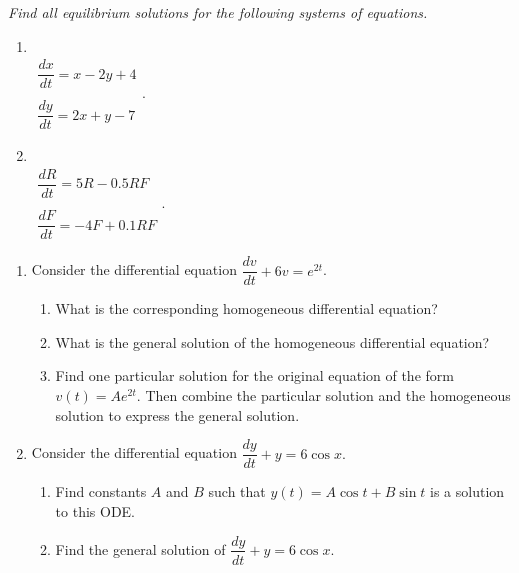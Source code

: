 \documentclass[10pt]{article}
\begin{document}
\textit{Find all equilibrium solutions for the following systems of equations.}

\begin{multicols}{2}
\begin{enumerate}
\setcounter{enumi}{\theenumCount}
\item ~ \\ $\begin{array}{c} \dfrac{dx}{dt} = x - 2y + 4 \\ ~ \\ \dfrac{dy}{dt} = 2x + y - 7 \end{array}$.


\item ~ \\ $\begin{array}{c} \dfrac{dR}{dt} = 5R - 0.5 RF \\ ~ \\ \dfrac{dF}{dt} = -4F + 0.1RF \end{array}$.

\setcounter{enumCount}{\theenumi}
\end{enumerate} 
\end{multicols}
\vfill


\newpage
\begin{enumerate}
\setcounter{enumi}{\theenumCount}
\item Consider the differential equation $\dfrac{dv}{dt} + 6v = e^{2t}$.  
\begin{enumerate}
\item What is the corresponding homogeneous differential equation? 
\vfill

\item What is the general solution of the homogeneous differential equation?
\vfill

\item Find one particular solution for the original equation of the form $v(t) = Ae^{2t}$. Then combine the particular solution and the homogeneous solution to express the general solution.  
\vfill
\end{enumerate}





\item Consider the differential equation $\dfrac{dy}{dt} + y = 6 \cos x.$
\begin{enumerate}
\item Find constants $A$ and $B$ such that $y(t) = A \cos t + B \sin t$ is a solution to this ODE.
\vfill


\item Find the general solution of $\dfrac{dy}{dt} + y = 6 \cos x$. 
\vfill
\end{enumerate}

\setcounter{enumCount}{\theenumi}
\end{enumerate}
\end{document}

